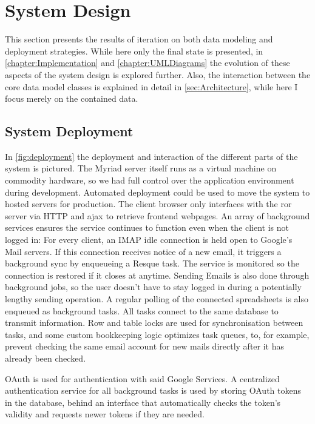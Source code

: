 \section{System Design}

This section presents the results of iteration on both data modeling and deployment strategies. While here only the final state is presented, in \autoref{chapter:Implementation} and \autoref{chapter:UMLDiagrams} the evolution of these aspects of the system design is explored further. Also, the interaction between the core data model classes is explained in detail in \autoref{sec:Architecture}, while here I focus merely on the contained data.



\subsection{System Deployment}

In \autoref{fig:deployment} the deployment and interaction of the different parts of the system is pictured. The Myriad server itself runs as a virtual machine on commodity hardware, so we had full control over the application environment during development. Automated deployment could be used to move the system to hosted servers for production. The client browser only interfaces with the \acrlong{ror} server via HTTP and \gls{ajax} to retrieve frontend webpages. An array of background services ensures the service continues to function even when the client is not logged in: For every client, an IMAP idle connection is held open to Google's Mail servers. If this connection receives notice of a new email, it triggers a background sync by enqueueing a Resque task. The service is monitored so the connection is restored if it closes at anytime.
Sending Emails is also done through background jobs, so the user doesn't have to stay logged in during a potentially lengthy sending operation. A regular polling of the connected spreadsheets is also enqueued as background tasks. All tasks connect to the same database to transmit information. Row and table locks are used for synchronisation between tasks, and some custom bookkeeping logic optimizes task queues, to, for example, prevent checking the same email account for new mails directly after it has already been checked.

OAuth is used for authentication with said Google Services. A centralized authentication service for all background tasks is used by storing OAuth tokens in the database, behind an interface that automatically checks the token's validity and requests newer tokens if they are needed.



